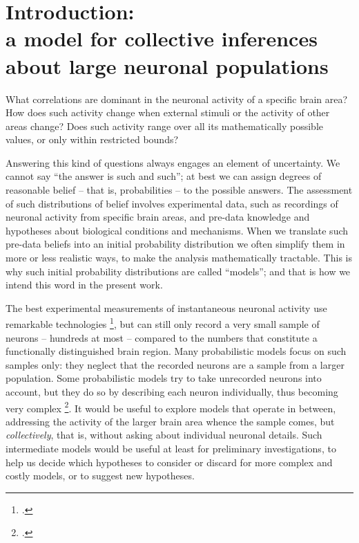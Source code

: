 \documentclass[\ifafour a4paper,12pt,\else a5paper,10pt,\fi%
onecolumn,oneside,article,%
british%
]{memoir}
\theoremstyle{remark}
\theoremstyle{innote}
\newcommand*{\citep}{\footcites}
\renewcommand*{\|}{\nonscript\,\vert\nonscript\;\mathopen{}}
\newcommand*{\puzzle}{{\fontencoding{U}\fontfamily{fontawesometwo}\selectfont\symbol{225}}}
\newcommand{\mynote}[1]{ {\color{notecolour}\puzzle\ #1}}
\begin{document}



\section{Introduction:\\a model for collective inferences about large neuronal
  populations}
\label{sec:intro}

What correlations are dominant in the neuronal activity of a specific brain
area? How does such activity change when external stimuli or the activity
of other areas change? Does such activity range over all its mathematically
possible values, or only within restricted bounds?

Answering this kind of questions always engages an element of uncertainty.
We cannot say \enquote{the answer is such and such}; at best we can assign
degrees of reasonable belief -- that is, probabilities -- to the possible
answers. The assessment of such distributions of belief involves
experimental data, such as recordings of neuronal activity from specific
brain areas, and pre-data knowledge and hypotheses about biological
conditions and mechanisms. When we translate such pre-data beliefs into an
initial probability distribution we often simplify them in more or less
realistic ways, to make the analysis mathematically tractable. This is why
such initial probability distributions are called \enquote{models}; and
that is how we intend this word in the present work.

The best experimental measurements of instantaneous neuronal activity use
remarkable technologies \citep{hongetal2019}, but can still only record a
very small sample of neurons -- hundreds at most -- compared to the numbers
that constitute a functionally distinguished brain region. Many
probabilistic models focus on such samples only: they neglect that the
recorded neurons are a sample from a larger population. Some probabilistic
models try to take unrecorded neurons into account, but they do so by
describing each neuron individually, thus becoming very complex
\citep{pillowetal2008,dunnetal2013,tyrchaetal2014,huang2015,battistinetal2017}.
It would be useful to explore models that operate in between, addressing
the activity of the larger brain area whence the sample comes, but
\emph{collectively}, that is, without asking about individual neuronal
details. Such intermediate models would be useful at least for preliminary
investigations, to help us decide which hypotheses to consider or discard
for more complex and costly models, or to suggest new hypotheses.
\end{document}
